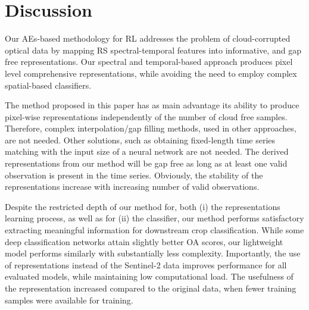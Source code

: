 \documentclass[journal,article,submit,pdftex,moreauthors]{Definitions/mdpi}
\begin{document}


\section{Discussion}
Our AEs-based methodology for RL addresses the problem of cloud-corrupted optical data by mapping RS spectral-temporal features into informative, and gap free representations.
Our spectral and temporal-based approach produces pixel level comprehensive representations, while avoiding the need to employ complex spatial-based classifiers.

The method proposed in this paper has as main advantage its ability to produce pixel-wise representations independently of the number of cloud free samples.
Therefore, complex interpolation/gap filling methods, used in other approaches, are not needed.
Other solutions, such as obtaining fixed-length time series matching with the input size of a neural network are not needed.
The derived representations from our method will be gap free as long as at least one valid observation is present in the time series. Obviously, the stability of the representations increase with increasing number of valid observations.

Despite the restricted depth of our method for, both (i) the representations learning process, as well as for (ii) the classifier, our method performs satisfactory extracting meaningful information for downstream crop classification. 
While some deep classification networks attain slightly better OA scores, our lightweight model performs similarly with substantially less complexity. Importantly, the use of representations instead of the Sentinel-2 data improves performance for all evaluated models, while maintaining low computational load. The usefulness of the representation increased compared to the original data, when fewer training samples were available for training. 
\end{document}
